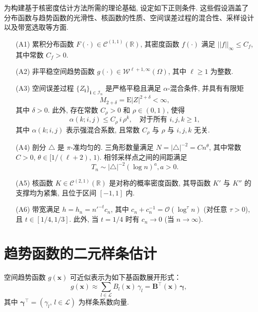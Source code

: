 \documentclass[a4paper,openay,14pt]{ctexbook}
\numberwithin{equation}{section}
\numberwithin{lem}{section}
\begin{document}
为构建基于核密度估计方法所需的理论基础, 设定如下正则条件. 这些假设涵盖了分布函数与趋势函数的光滑性、核函数的性质、空间误差过程的混合性、采样设计以及带宽选取等方面.

\begin{itemize}
\item[(A1)] 累积分布函数 $F(\cdot) \in \mathcal{C}^{(1,1)}(\mathbb{R})$, 其密度函数 $f(\cdot)$ 满足 \( || f ||_{\infty} \leq C_f \), 其中常数 \( C_f > 0 \).

\item[(A2)] 非平稳空间趋势函数 $g(\cdot) \in \mathcal{W}^{\ell+1, \infty}(\Omega)$, 其中 $\ell \geq 1$ 为整数.

\item[(A3)] 空间误差过程 $\{ Z_{\mathbf{i}} \}_{\mathbf{i} \in \mathcal{I}_n}$ 是严格平稳且满足 $\alpha$-混合条件, 并具有有限矩
\[
M_{2+\delta} = \mathrm{E}|Z|^{2+\delta} < \infty,
\]
其中 $\delta > 0$. 此外, 存在常数 $C_\rho > 0$ 和 $\rho \in (0,1)$, 使得
\[
\alpha(k; i, j) \leq C_\rho\, i\, \rho^k, \quad \text{对于所有 } i, j, k \geq 1,
\]
其中 $\alpha(k; i, j)$ 表示强混合系数, 且常数 $C_\rho$ 与 $\rho$ 与 $i, j, k$ 无关.

\item[(A4)] 剖分 $\triangle$ 是 $\pi$-准均匀的. 三角形数量满足 $N = |\triangle|^{-2} = C n^\theta$, 其中常数 $C > 0$, $\theta \in [1/(\ell+2),\,1)$. 相邻采样点之间的间距满足
\[
T_n \sim |\triangle|^{-2} (\log n)^a, a > 0.\]

\item[(A5)] 核函数 $K \in \mathcal{C}^{(2,1)}(\mathbb{R})$ 是对称的概率密度函数, 其导函数 $K'$ 与 $K''$ 的支撑均为紧集, 且位于区间 $[-1,1]$ 内.

\item[(A6)] 带宽满足 $h = h_n = n'^{-t} c_n$, 其中 $c_n + c_n^{-1} = {\scriptstyle{\mathcal{O}}}(\log^\tau n)$ (对任意 $\tau > 0$), 且 $t \in [1/4, 1/3]$. 此外, 当 $t = 1/4$ 时有 $c_n \to 0$ (当 $n \to \infty$).
\end{itemize}

\section{趋势函数的二元样条估计}

空间趋势函数 $g(\boldsymbol{x})$ 可近似表示为如下基函数展开形式：
\[
  g(\boldsymbol{x})
   \approx \sum_{l\in\mathcal{L}} B_l(\boldsymbol{x})\,\gamma_l
  = \mathbf{B}^\top(\boldsymbol{x})\,\boldsymbol{\gamma},
\]
其中 $\boldsymbol{\gamma}^\top=(\gamma_l,\,l\in\mathcal{L})$ 为样条系数向量.
\end{document}
